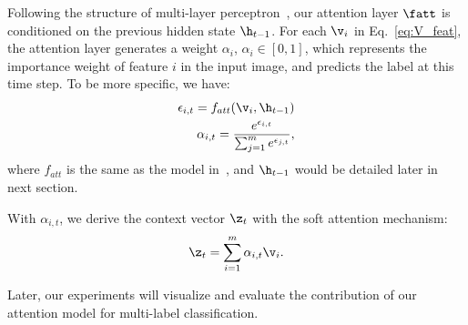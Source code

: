 \documentclass[letterpaper]{article} %
\begin{document}

Following the structure of multi-layer perceptron~\cite{xu2015show}, our attention layer $\fatt$ is conditioned on the previous hidden state $\h_{t-1}$. For each $\v_i$ in Eq.~\ref{eq:V_feat}, the attention layer generates a weight $\alpha_i$, $\alpha_i \in [0, 1]$, which represents the importance weight of feature $i$ in the input image, and predicts the label at this time step. To be more specific, we have:
\begin{equation}
\label{eq:atten_weight}
\begin{aligned}
\epsilon_{i,t} = f_{att}(\v_i, \h_{t-1}) \\
\alpha_{i,t} = \frac{e^{\epsilon_{i,t}} }{ \sum_{j=1}^m e^{\epsilon_{j,t}}},
\end{aligned}
\end{equation}
where $f_{att}$ is the same as the model in~\cite{xu2015show}, and $\h_{t-1}$ would be detailed later in next section.

With $\alpha_{i,t}$, we derive the context vector $\z_t$ with the soft attention mechanism:
\begin{equation}
\label{eq:context}
\begin{aligned}
\z_t = \sum_{i=1}^m \alpha_{i,t}\v_i.
\end{aligned}
\end{equation}

Later, our experiments will visualize and evaluate the contribution of our attention model for multi-label classification.\\
\end{document}
